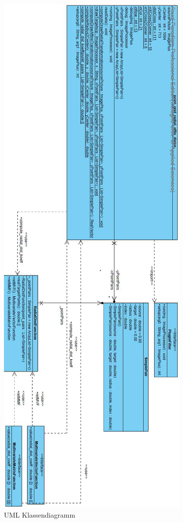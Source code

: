 \begin{figure}[H]
\center
\includegraphics[height=\textheight]{Images/UML.JPG}
\caption{UML Klassendiagramm}
\label{img:UML}
\end{figure}

\newpage
